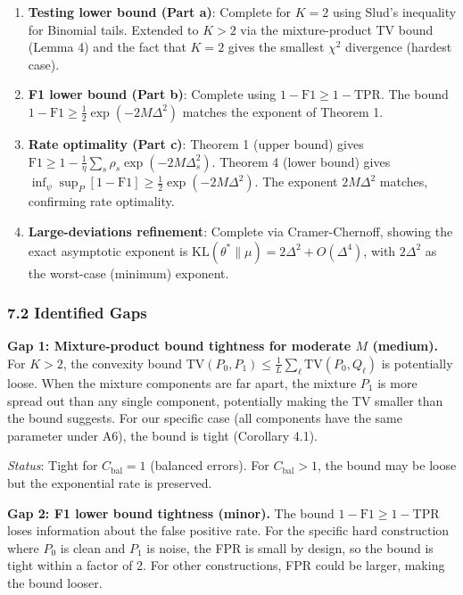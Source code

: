 \documentclass[
  12pt,
]{article}
\begin{document}
\begin{enumerate}
\def\labelenumi{\arabic{enumi}.}
\item
  \textbf{Testing lower bound (Part a)}: Complete for \(K=2\) using
  Slud's inequality for Binomial tails. Extended to \(K>2\) via the
  mixture-product TV bound (Lemma 4) and the fact that \(K=2\) gives the
  smallest \(\chi^2\) divergence (hardest case).
\item
  \textbf{F1 lower bound (Part b)}: Complete using
  \(1-\text{F1} \geq 1-\text{TPR}\). The bound
  \(1-\text{F1} \geq \frac{1}{2}\exp(-2M\Delta^2)\) matches the exponent
  of Theorem 1.
\item
  \textbf{Rate optimality (Part c)}: Theorem 1 (upper bound) gives
  \(\text{F1} \geq 1 - \frac{1}{\eta}\sum_s\rho_s\exp(-2M\Delta_s^2)\).
  Theorem 4 (lower bound) gives
  \(\inf_\psi\sup_P[1-\text{F1}] \geq \frac{1}{2}\exp(-2M\Delta^2)\).
  The exponent \(2M\Delta^2\) matches, confirming rate optimality.
\item
  \textbf{Large-deviations refinement}: Complete via Cramer-Chernoff,
  showing the exact asymptotic exponent is
  \(\text{KL}(\theta^* \parallel \mu) = 2\Delta^2 + O(\Delta^4)\), with
  \(2\Delta^2\) as the worst-case (minimum) exponent.
\end{enumerate}

\subsubsection{7.2 Identified Gaps}\label{identified-gaps}

\textbf{Gap 1: Mixture-product bound tightness for moderate \(M\)
(medium).} For \(K > 2\), the convexity bound
\(\text{TV}(P_0, P_1) \leq \frac{1}{L}\sum_\ell \text{TV}(P_0, Q_\ell)\)
is potentially loose. When the mixture components are far apart, the
mixture \(P_1\) is more spread out than any single component,
potentially making the TV smaller than the bound suggests. For our
specific case (all components have the same parameter under A6), the
bound is tight (Corollary 4.1).

\emph{Status}: Tight for \(C_{\text{bal}} = 1\) (balanced errors). For
\(C_{\text{bal}} > 1\), the bound may be loose but the exponential rate
is preserved.

\textbf{Gap 2: F1 lower bound tightness (minor).} The bound
\(1-\text{F1} \geq 1-\text{TPR}\) loses information about the false
positive rate. For the specific hard construction where \(P_0\) is clean
and \(P_1\) is noise, the FPR is small by design, so the bound is tight
within a factor of 2. For other constructions, FPR could be larger,
making the bound looser.
\end{document}
